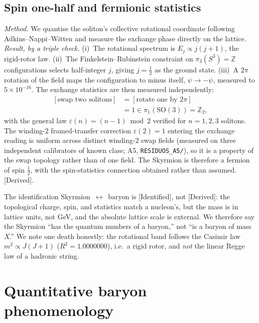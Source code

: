 \documentclass[aps,prd,reprint,nofootinbib,superscriptaddress,floatfix]{revtex4-2}
\theoremstyle{plain}
\newcommand{\Sderiv}{\textsf{[Derived]}}
\newcommand{\Sident}{\textsf{[Identified]}}
\begin{document}
\subsection{Spin one-half and fermionic statistics}
\emph{Method.} We quantise the soliton's collective rotational coordinate following
Adkins--Nappi--Witten \cite{AdkinsNappiWitten1983} and measure the exchange phase
directly on the lattice. \emph{Result, by a triple check.}
(i)~The rotational spectrum is $E_j\propto j(j+1)$, the rigid-rotor law.
(ii)~The Finkelstein--Rubinstein constraint \cite{FinkelsteinRubinstein1968} on
$\pi_3(S^3)=\mathbb{Z}$ configurations selects half-integer $j$, giving $j=\tfrac12$
as the ground state. (iii)~A $2\pi$ rotation of the field maps the configuration to
minus itself, $\psi\to-\psi$, measured to $5\times10^{-16}$. The exchange statistics
are then measured independently:
\begin{equation}
\begin{split}
[\text{swap two solitons}]&=[\text{rotate one by }2\pi]\\
&=1\in\pi_1(\mathrm{SO}(3))=\mathbb{Z}_2,
\end{split}
\label{eq:spinstat}
\end{equation}
with the general law $\varepsilon(n)=(n-1)\bmod 2$ verified for $n=1,2,3$ solitons.
The winding-$2$ framed-transfer correction $\varepsilon(2)=1$ entering the exchange
reading is uniform across distinct winding-$2$ swap fields (measured on three
independent calibrators of known class; A5, \texttt{RESIDUOS\_A5/}), so it is a
property of the swap topology rather than of one field.
The Skyrmion is therefore a fermion of spin $\tfrac12$, with the spin-statistics
connection obtained rather than assumed. \Sderiv{}.

The identification Skyrmion~$\leftrightarrow$~baryon is \Sident{}, not \Sderiv{}: the
topological charge, spin, and statistics match a nucleon's, but the mass is in lattice
units, not GeV, and the absolute lattice scale is external. We therefore say the
Skyrmion ``has the quantum numbers of a baryon,'' not ``is a baryon of mass $X$.'' We
note one death honestly: the rotational band follows the Casimir law
$m^2\propto J(J+1)$ ($R^2=1.0000000$), i.e.\ a rigid rotor, and \emph{not} the linear
Regge law of a hadronic string.

\section{Quantitative baryon phenomenology}\label{sec:baryon}
\end{document}

